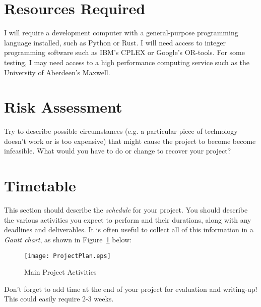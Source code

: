 \documentclass[a4paper,12pt]{article}
\begin{document}
\section*{Resources Required}

I will require a development computer with a general-purpose programming
language installed, such as Python or Rust. I will need access to integer
programming software such as IBM's CPLEX or Google's OR-tools. For some
testing, I may need access to a high performance computing service such
as the University of Aberdeen's Maxwell.

\section*{Risk Assessment}

Try to describe possible circumstances (e.g. a particular piece of
technology doesn't work or is too expensive) that might cause
the project to become become infeasible. What would you have to do
or change to recover your project?

\section*{Timetable}

This section should describe the {\em schedule} for your project. 
You should describe the various activities you expect to perform
and their durations, along with any deadlines and deliverables.
It is often useful to collect all of this information in a
{\em Gantt chart}, as shown in Figure~\ref{fig:plan} below:

\begin{figure}[htb]
\begin{center}
\texttt{[image: ProjectPlan.eps]}
\caption{Main Project Activities\label{fig:plan}}
\end{center}
\end{figure}


Don't forget to add time at the end of your project for 
evaluation and writing-up! This could easily require 2-3 weeks.



\end{document}

